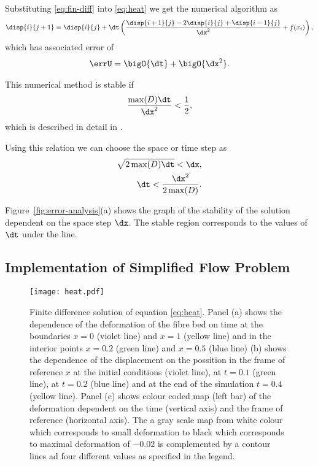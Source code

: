 \documentclass[twoside,a4paper,12pt]{article}
\newcommand{\figref}[1]{Figure~\ref{#1}}
\newcommand{\note}[1]{}
\begin{document}
Substituting \eqref{eq:fin-diff} into \eqref{eq:heat} we get the
numerical algorithm as
%
\begin{align}
\disp{i}{j+1}  =   \disp{i}{j} + \dt\left(\frac{\disp{i+1}{j} - 2\disp{i}{j} + \disp{i-1}{j}}{\dx^2}   + f(x_i) \right), \label{eq:findiff-alg}
\end{align}
%
which has associated error of
\begin{align}
  \errU =\bigO{\dt} + \bigO{\dx^2}.
\end{align}

This numerical method is stable if
\begin{align}
  \frac{\max(D)\dt}{\dx^2} < \frac{1}{2},
\end{align}
which is described in detail in \cite{Strikwerda2004}.
%
\note{derivation from page 47}
%
Using this relation we can choose the space or time step as
%
\begin{align}
  \sqrt{2\max(D)\dt} < \dx, \\
  \dt < \frac{\dx^2}{2\max(D)}.\label{eq:stable-boundary}
\end{align}

\figref{fig:error-analysis}(a) shows the graph of the stability of the
solution dependent on the space step $\dx$. The stable region
corresponds to the values of $\dt$ under the line.

\subsection{Implementation of Simplified Flow Problem}

\begin{figure}
  \centering
  \texttt{[image: heat.pdf]}
  \caption{Finite difference solution of equation
    \eqref{eq:heat}. Panel (a) shows the dependence of the deformation
    of the fibre bed on time at the boundaries $x=0$ (violet line) and
    $x=1$ (yellow line) and in the interior points $x=0.2$ (green
    line) and $x=0.5$ (blue line) (b) shows the dependence of the
    displacement on the possition in the frame of reference $x$ at the
    initial conditions (violet line), at $t=0.1$ (green line), at
    $t=0.2$ (blue line) and at the end of the simulation $t=0.4$
    (yellow line).  Panel (c) shows colour coded map (left bar) of the
    deformation dependent on the time (vertical axis) and the frame of
    reference (horizontal axis). The a gray scale map from white
    colour which corresponds to small deformation to black which
    corresponds to maximal deformation of $-0.02$ is complemented by a
    contour lines ad four different values as specified in the legend.}
  \label{fig:findiff-heat}
\end{figure}
\end{document}

